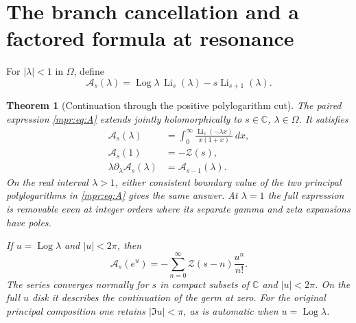 \documentclass[11pt,letterpaper]{article}
\numberwithin{equation}{section}
\newtheorem{theorem}{Theorem}[section]
\theoremstyle{definition}
\theoremstyle{remark}
\begin{document}
\section{The branch cancellation and a factored formula at resonance}
\label{mpr:sec:resonance}

For $|\lambda|<1$ in $\Omega$, define
\begin{equation}\label{mpr:eq:A}
 \mathcal A_s(\lambda)
    =\operatorname{Log}\lambda\,\operatorname{Li}_s(\lambda)
                         -s\operatorname{Li}_{s+1}(\lambda).
\end{equation}

\begin{theorem}[Continuation through the positive polylogarithm cut]
\label{mpr:thm:A}
The paired expression \eqref{mpr:eq:A} extends jointly holomorphically
to $s\in\mathbb C$, $\lambda\in\Omega$.  It satisfies
\begin{align}
 \mathcal A_s(\lambda)
    &=\int_0^\infty
        \frac{\operatorname{Li}_s(-\lambda x)}{x(1+x)}\,dx,
          \label{mpr:eq:Aintegral}\\
 \mathcal A_s(1)&=-\mathscr Z(s),
          \label{mpr:eq:Aone}\\
 \lambda\partial_\lambda\mathcal A_s(\lambda)
          &=\mathcal A_{s-1}(\lambda).
          \label{mpr:eq:Aderivative}
\end{align}
On the real interval $\lambda>1$, either consistent boundary value of
the two principal polylogarithms in \eqref{mpr:eq:A} gives the same
answer.  At $\lambda=1$ the full expression is removable even at
integer orders where its separate gamma and zeta expansions have poles.

If $u=\operatorname{Log}\lambda$ and $|u|<2\pi$, then
\begin{equation}\label{mpr:eq:localexpansion}
 \boxed{\displaystyle
 \mathcal A_s(e^u)
      =-\sum_{n=0}^\infty\mathscr Z(s-n)\frac{u^n}{n!}.}
\end{equation}
The series converges normally for $s$ in compact subsets of $\mathbb C$
and $|u|<2\pi$.  On the full $u$ disk it describes the continuation of
the germ at zero.  For the original principal composition one retains
$|\Im u|<\pi$, as is automatic when $u=\operatorname{Log}\lambda$.
\end{theorem}
\end{document}
